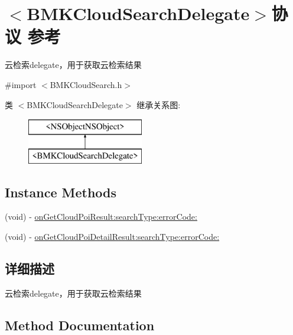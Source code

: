\hypertarget{protocol_b_m_k_cloud_search_delegate-p}{}\section{$<$B\+M\+K\+Cloud\+Search\+Delegate$>$协议 参考}
\label{protocol_b_m_k_cloud_search_delegate-p}


云检索delegate，用于获取云检索结果  




{\ttfamily \#import $<$B\+M\+K\+Cloud\+Search.\+h$>$}

类 $<$B\+M\+K\+Cloud\+Search\+Delegate$>$ 继承关系图\+:\begin{figure}[H]
\begin{center}
\leavevmode
\includegraphics[height=2.000000cm]{protocol_b_m_k_cloud_search_delegate-p}
\end{center}
\end{figure}
\subsection*{Instance Methods}
\begin{DoxyCompactItemize}
\item 
(void) -\/ \hyperlink{protocol_b_m_k_cloud_search_delegate-p_aadc90dad37954d8527d4aca657c802f4}{on\+Get\+Cloud\+Poi\+Result\+:search\+Type\+:error\+Code\+:}
\item 
(void) -\/ \hyperlink{protocol_b_m_k_cloud_search_delegate-p_a5abcb777d4533baa036beb635268b60d}{on\+Get\+Cloud\+Poi\+Detail\+Result\+:search\+Type\+:error\+Code\+:}
\end{DoxyCompactItemize}


\subsection{详细描述}
云检索delegate，用于获取云检索结果 

\subsection{Method Documentation}
\hypertarget{protocol_b_m_k_cloud_search_delegate-p_a5abcb777d4533baa036beb635268b60d}{}

